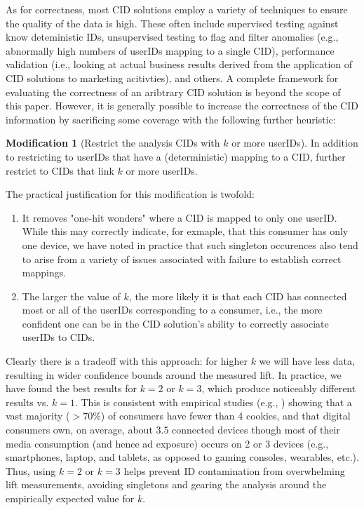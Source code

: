 \documentclass[11pt,a4paper]{article}
\theoremstyle{definition}
\theoremstyle{remark}
\theoremstyle{definition}
\theoremstyle{definition}
\theoremstyle{definition}
\theoremstyle{definition}
\theoremstyle{definition}
\newtheorem{modification}{Modification}[section]
\theoremstyle{definition}
\begin{document}
As for correctness, most CID solutions employ a variety of techniques to ensure the quality of the data is high. These often include supervised testing against know deteministic IDs, unsupervised testing to flag and filter anomalies (e.g., abnormally high numbers of userIDs mapping to a single CID), performance validation (i.e., looking at actual business results derived from the application of CID solutions to marketing acitivties), and others. A complete framework for evaluating the correctness of an aribtrary CID solution is beyond the scope of this paper. However, it is generally possible to increase the correctness of the CID information by sacrificing some coverage with the following further heuristic: 

\begin{modification}[Restrict the analysis CIDs with $k$ or more userIDs]
In addition to restricting to userIDs that have a (deterministic) mapping to a CID, further restrict to CIDs that link $k$ or more userIDs. 
\end{modification}

The practical justification for this modification is twofold: 
\begin{enumerate}
\item It removes "one-hit wonders" where a CID is mapped to only one userID. While this may correctly indicate, for exmaple, that this consumer has only one device, we have noted in practice that such singleton occurences also tend to arise from a variety of issues associated with failure to establish correct mappings. 
\item The larger the value of $k$, the more likely it is that each CID has connected most or all of the userIDs corresponding to a consumer, i.e., the more confident one can be in the CID solution's ability to correctly associate userIDs to CIDs.
\end{enumerate}

Clearly there is a tradeoff with this approach: for higher $k$ we will have less data, resulting in wider confidence bounds around the measured lift. In practice, we have found the best results for $k=2$ or $k=3$, which produce noticeably different results vs. $k=1$. This is consistent with empirical studies (e.g., \cite{coey2016people}) showing that a vast majority ($> 70\%$) of consumers have fewer than 4 cookies, and that digital consumers own, on average, about 3.5 connected devices \cite{emarketer-2016}
though most of their media consumption (and hence ad exposure) occurs on 2 or 3 devices (e.g., smartphones, laptop, and tablets, as opposed to gaming consoles, wearables, etc.). Thus, using $k=2$ or $k=3$ helps prevent ID contamination from overwhelming lift measurements, avoiding singletons and gearing the analysis around the empirically expected value for $k$.
\end{document}

